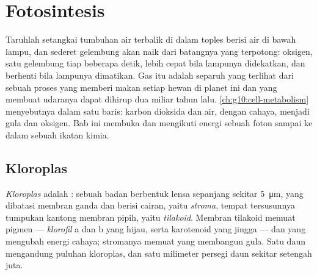 \chapter{Fotosintesis}\label{ch:g12:photosynthesis}

Taruhlah setangkai tumbuhan air terbalik di dalam toples berisi air di
bawah lampu, dan sederet gelembung akan naik dari batangnya yang
terpotong: oksigen, satu gelembung tiap beberapa detik, lebih cepat
bila lampunya didekatkan, dan berhenti bila lampunya dimatikan. Gas itu
adalah separuh yang terlihat dari sebuah proses yang memberi makan
setiap hewan di planet ini dan yang membuat udaranya dapat dihirup dua
miliar tahun lalu. \cref{ch:g10:cell-metabolism} menyebutnya dalam satu
baris: karbon dioksida dan air, dengan cahaya, menjadi gula dan
oksigen. Bab ini membuka  dan mengikuti energi sebuah foton
sampai ke dalam sebuah ikatan kimia.

\section{Kloroplas}

\begin{definition}[Kloroplas]\label{def:g12:photosynthesis:chloroplast}
\emph{Kloroplas} adalah  : sebuah
badan berbentuk lensa sepanjang sekitar \qty{5}{\micro m}, yang
dibatasi membran ganda dan berisi cairan, yaitu \emph{stroma}, tempat
tersusunnya tumpukan kantong membran pipih, yaitu \emph{tilakoid}.
Membran tilakoid memuat pigmen --- \emph{klorofil} a dan b yang hijau,
serta karotenoid yang jingga --- dan  yang mengubah energi
cahaya; stromanya memuat  yang membangun gula. Satu  daun
mengandung puluhan kloroplas, dan satu milimeter persegi daun sekitar
setengah juta.
\end{definition}


